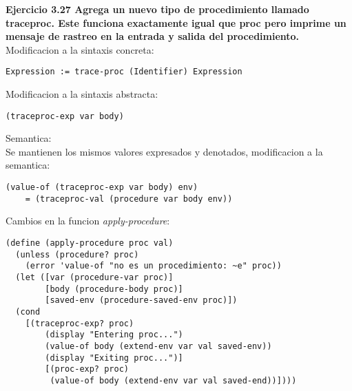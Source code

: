 \documentclass[a4paper]{article}
\begin{document}
\textbf{Ejercicio 3.27 Agrega un nuevo tipo de procedimiento llamado traceproc. Este funciona exactamente igual que proc pero imprime un mensaje de rastreo en la entrada y salida del procedimiento.}\\
Modificacion a la sintaxis concreta: 
\begin{lstlisting}
Expression := trace-proc (Identifier) Expression
\end{lstlisting}
Modificacion a la sintaxis abstracta:
\begin{lstlisting}
(traceproc-exp var body)
\end{lstlisting}
Semantica:\\
Se mantienen los mismos valores expresados y denotados, modificacion a la semantica:
\begin{lstlisting}
(value-of (traceproc-exp var body) env)
	= (traceproc-val (procedure var body env))
\end{lstlisting}
Cambios en la funcion \textit{apply-procedure}:
\begin{lstlisting}
(define (apply-procedure proc val)
  (unless (procedure? proc)
    (error 'value-of "no es un procedimiento: ~e" proc))
  (let ([var (procedure-var proc)]
        [body (procedure-body proc)]
        [saved-env (procedure-saved-env proc)])
  (cond 
  	[(traceproc-exp? proc)
  		(display "Entering proc...")
  		(value-of body (extend-env var val saved-env))
  		(display "Exiting proc...")]
        [(proc-exp? proc)
         (value-of body (extend-env var val saved-end))])))
 \end{lstlisting}
 
\end{document}
